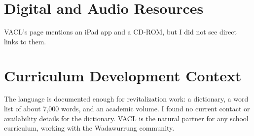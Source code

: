 \documentclass[12pt]{article}
\begin{document}
\section{Digital and Audio Resources}
VACL's page mentions an iPad app and a CD-ROM, but I did not see direct links to them.

\section{Curriculum Development Context}
The language is documented enough for revitalization work: a dictionary, a word list of about 7,000 words, and an academic volume. I found no current contact or availability details for the dictionary. VACL is the natural partner for any school curriculum, working with the Wadawurrung community.
\end{document}
